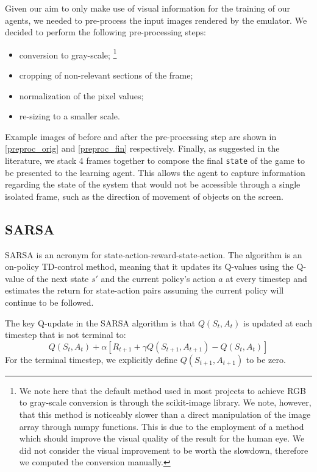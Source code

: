 \documentclass[letterpaper]{article} %
\begin{document}
Given our aim to only make use of visual information for the training of our agents, we needed to pre-process the input images rendered by the emulator. We decided to perform the following pre-processing steps:
\begin{itemize}
    \item conversion to gray-scale; \footnote{We note here that the default method used in most projects to achieve RGB to gray-scale conversion is through the scikit-image library. We note, however, that this method is noticeably slower than a direct manipulation of the image array through numpy functions. This is due to the employment of a method which should improve the visual quality of the result for the human eye. We did not consider the visual improvement to be worth the slowdown, therefore we computed the conversion manually.}
    
    \item cropping of non-relevant sections of the frame;
    \item normalization of the pixel values;
    \item re-sizing to a smaller scale.
\end{itemize}
Example images of before and after the pre-processing step are shown in \cref{preproc_orig} and \cref{preproc_fin} respectively. Finally, as suggested in the literature, we stack 4 frames together to compose the final \verb|state| of the game to be presented to the learning agent. This allows the agent to capture information regarding the state of the system that would not be accessible through a single isolated frame, such as the direction of movement of objects on the screen.


\subsection{SARSA}
SARSA is an acronym for state-action-reward-state-action. The algorithm is an on-policy TD-control method, meaning that it updates its Q-values using the Q-value of the next state $s'$ and the current policy's action $a$ at every timestep and estimates the return for state-action pairs assuming the current policy will continue to be followed.

The key Q-update in the SARSA algorithm is that $Q(S_t,A_t)$ is updated at each timestep that is not terminal to: $$ Q(S_t,A_t) + \alpha \left[R_{t+1} + \gamma Q(S_{t+1},A_{t+1}) - Q(S_t,A_t)\right]$$ For the terminal timestep, we explicitly define $Q(S_{t+1},A_{t+1})$ to be zero. 
\end{document}
